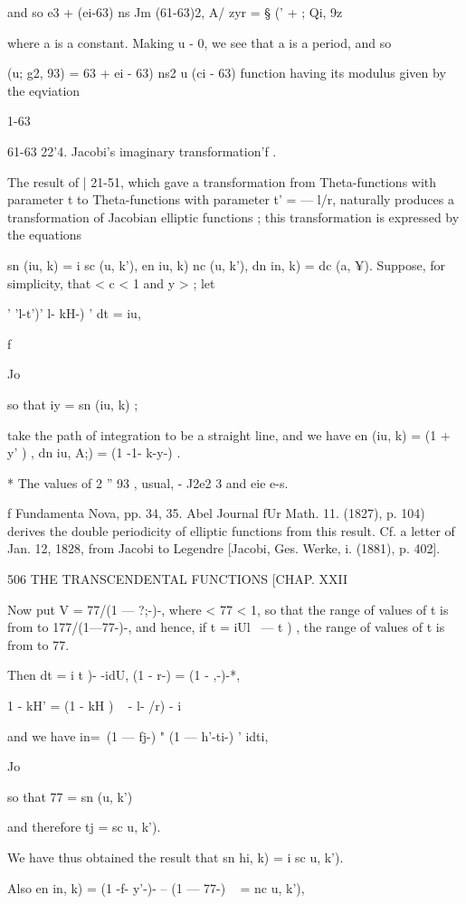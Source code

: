 and so e3 + (ei-63) ns Jm (61-63)2, A/ zyr = § (' + ; Qi, 9z\

where a is a constant. Making u - 0, we see that a is a period, and so

  (u; g2, 93) = 63 + ei - 63) ns2 u (ci - 63)%
function having its modulus given by the eqviation

1-63

61-63 22'4. Jacobi's imaginary transformation'f .

The result of | 21-51, which gave a transformation from
Theta-functions with parameter t to Theta-functions with parameter t'
= — l/r, naturally produces a transformation of Jacobian elliptic
functions ; this transformation is expressed by the equations

sn (iu, k) = i sc (u, k'), en iu, k) nc (u, k'), dn in, k) = dc (a,
¥). Suppose, for simplicity, that < c < 1 and y > ; let

' 'l-t')' l- kH-) ' dt = iu,

f

Jo

so that iy = sn (iu, k) ;

take the path of integration to be a straight line, and we have en
(iu, k) = (1 + y' ) , dn iu, A;) = (1 -1- k-y-) .

* The values of 2 '' 93 , usual, - J2e2 3 and eie e-s.

f Fundamenta Nova, pp. 34, 35. Abel Journal fUr Math. 11. (1827), p.
104) derives the double periodicity of elliptic functions from this
result. Cf. a letter of Jan. 12, 1828, from Jacobi to Legendre
[Jacobi, Ges. Werke, i. (1881), p. 402].

506 THE TRANSCENDENTAL FUNCTIONS [CHAP. XXII

Now put V = 77/(1 — ?;-)-, where < 77 < 1, so that the range of values
of t is from to 177/(1—77-)-, and hence, if t = iUl \ — t ) , the
range of values of t is from to 77.

Then dt = i t )- -idU, (1 - r-) = (1 - ,-)-*,

1 - kH' = (1 - kH ) ~ - l- /r) - i

and we have in=\ (1 — fj-) " (1 — h'-ti-) ' idti,

Jo

so that 77 = sn (u, k')

and therefore tj = sc u, k').

We have thus obtained the result that sn hi, k) = i sc u, k').

Also en in, k) = (1 -f- y'-)- -- (1 — 77-) ~ = nc u, k'),

